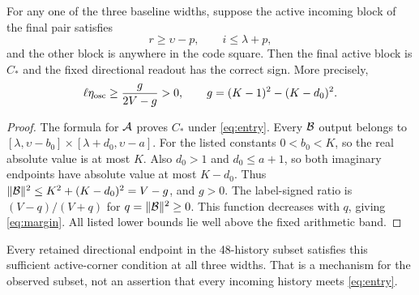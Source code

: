 \begin{theorem}\label{thm:corner}
For any one of the three baseline widths, suppose the active incoming block of the final pair satisfies
\begin{equation}\label{eq:entry}
 r\ge\upsilon-p,\qquad i\le\lambda+p,
\end{equation}
and the other block is anywhere in the code square. Then the final active block is $C_*$ and the fixed directional readout has the correct sign. More precisely,
\begin{equation}\label{eq:margin}
 \ell\eta_{\rm osc}\ge\frac{g}{2V-g}>0,\qquad
 g=(K-1)^2-(K-d_0)^2 .
\end{equation}
\end{theorem}
\begin{proof}
The formula for $\mathcal A$ proves $C_*$ under \eqref{eq:entry}. Every $\mathcal B$ output belongs to
$[\lambda,\upsilon-b_0]\times[\lambda+d_0,\upsilon-a]$.
For the listed constants $0<b_0<K$, so the real absolute value is at most $K$. Also $d_0>1$ and $d_0\le a+1$, so both imaginary endpoints have absolute value at most $K-d_0$. Thus $\lVert\mathcal B\rVert^2\le K^2+(K-d_0)^2=V-g$, and $g>0$. The label-signed ratio is $(V-q)/(V+q)$ for $q=\lVert\mathcal B\rVert^2\ge0$. This function decreases with $q$, giving \eqref{eq:margin}. All listed lower bounds lie well above the fixed arithmetic band.
\end{proof}
Every retained directional endpoint in the 48-history subset satisfies this sufficient active-corner condition at all three widths. That is a mechanism for the observed subset, not an assertion that every incoming history meets \eqref{eq:entry}.

